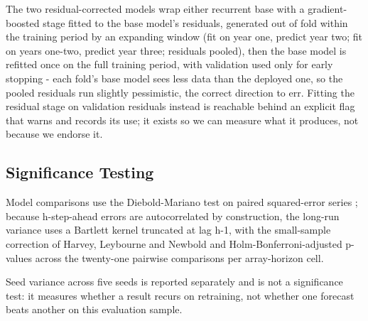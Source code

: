 The two residual-corrected models wrap either recurrent base with a
gradient-boosted stage fitted to the base model's residuals, generated
out of fold within the training period by an expanding window (fit on
year one, predict year two; fit on years one-two, predict year three;
residuals pooled), then the base model is refitted once on the full
training period, with validation used only for early stopping - each
fold's base model sees less data than the deployed one, so the pooled
residuals run slightly pessimistic, the correct direction to err.
Fitting the residual stage on validation residuals instead is reachable
behind an explicit flag that warns and records its use; it exists so we
can measure what it produces, not because we endorse it.

\subsection{Significance Testing}
\label{sec:methodology-significance-testing}

Model comparisons use the Diebold-Mariano test on paired squared-error
series \cite{diebold1995comparing}; because h-step-ahead errors are
autocorrelated by construction, the long-run variance uses a Bartlett
kernel truncated at lag h-1, with the small-sample correction of
Harvey, Leybourne and Newbold \cite{harvey1997testing} and
Holm-Bonferroni-adjusted p-values across the twenty-one pairwise
comparisons per array-horizon cell.

Seed variance across five seeds is reported separately and is not a
significance test: it measures whether a result recurs on retraining,
not whether one forecast beats another on this evaluation sample.
